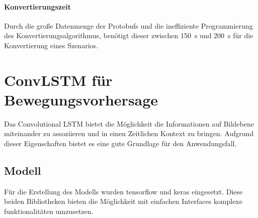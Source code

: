 \documentclass[12pt]{article}
\begin{document}
        \paragraph{Konvertierungszeit} Durch die große Datenmenge der Protobufs und die ineffiziente Programmierung des Konvertierungsalgorithmus, 
        benötigt dieser zwischen 150~s und 200~s für die Konvertierung eines Szenarios.

\section{ConvLSTM für Bewegungsvorhersage}
    Das Convolutional LSTM bietet die Möglichkeit die Informationen auf Bildebene miteinander zu assoziieren 
    und in einen Zeitlichen Kontext zu bringen. Aufgrund dieser Eigenschaften bietet es eine gute Grundlage für den Anwendungsfall.
    \subsection{Modell}
        Für die Erstellung des Modells wurden tensorflow und keras eingesetzt. 
        Diese beiden Bibliotheken bieten die Möglichkeit mit einfachen Interfaces komplexe funktionalitäten umzusetzen.
\end{document}
